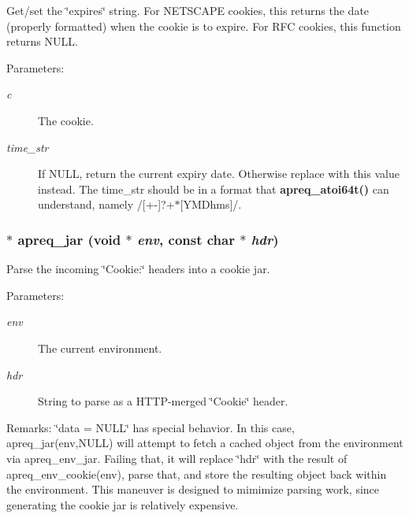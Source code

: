 Get/set the \char`\"{}expires\char`\"{} string. For NETSCAPE cookies, this returns the date (properly formatted) when the cookie is to expire. For RFC cookies, this function returns NULL.

\begin{Desc}
\item[Parameters:]
\begin{description}
\item[{\em c}]The cookie. \item[{\em time\_\-str}]If NULL, return the current expiry date. Otherwise replace with this value instead. The time\_\-str should be in a format that {\bf apreq\_\-atoi64t()} can understand, namely /[+-]?+$\ast$[YMDhms]/. \end{description}
\end{Desc}
\subsubsection{$\ast$ apreq\_\-jar (void $\ast$ {\em env}, const char $\ast$ {\em hdr})}\label{group__cookies_a4}


Parse the incoming \char`\"{}Cookie:\char`\"{} headers into a cookie jar.

\begin{Desc}
\item[Parameters:]
\begin{description}
\item[{\em env}]The current environment. \item[{\em hdr}]String to parse as a HTTP-merged \char`\"{}Cookie\char`\"{} header. \end{description}
\end{Desc}
\begin{Desc}
\item[Remarks:]\char`\"{}data = NULL\char`\"{} has special behavior. In this case, apreq\_\-jar(env,NULL) will attempt to fetch a cached object from the environment via apreq\_\-env\_\-jar. Failing that, it will replace \char`\"{}hdr\char`\"{} with the result of apreq\_\-env\_\-cookie(env), parse that, and store the resulting object back within the environment. This maneuver is designed to mimimize parsing work, since generating the cookie jar is relatively expensive. \end{Desc}
